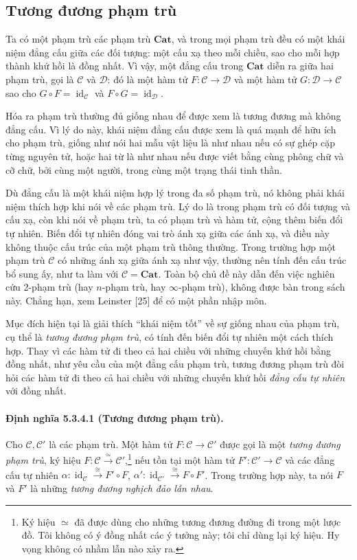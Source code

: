 \subsection{Tương đương phạm trù}
Ta có một phạm trù các phạm trù $\mathbf{Cat}$, và trong mọi phạm trù đều có một khái niệm đẳng cấu giữa các đối tượng: một cấu xạ theo mỗi chiều, sao cho mỗi hợp thành khứ hồi là đồng nhất. Vì vậy, một đẳng cấu trong $\mathbf{Cat}$ diễn ra giữa hai phạm trù, gọi là $\mathcal C$ và $\mathcal D$: đó là một hàm tử $F:\mathcal C\to\mathcal D$ và một hàm tử $G:\mathcal D\to\mathcal C$ sao cho $G\circ F=\operatorname{id}_{\mathcal C}$ và $F\circ G=\operatorname{id}_{\mathcal D}$.

Hóa ra phạm trù thường đủ giống nhau để được xem là tương đương mà không đẳng cấu. Vì lý do này, khái niệm đẳng cấu được xem là quá mạnh để hữu ích cho phạm trù, giống như nói hai mẫu vật liệu là như nhau nếu có sự ghép cặp từng nguyên tử, hoặc hai từ là như nhau nếu được viết bằng cùng phông chữ và cỡ chữ, bởi cùng một người, trong cùng một trạng thái tinh thần.

Dù đẳng cấu là một khái niệm hợp lý trong đa số phạm trù, nó không phải khái niệm thích hợp khi nói về các phạm trù. Lý do là trong phạm trù có đối tượng và cấu xạ, còn khi nói về phạm trù, ta có phạm trù và hàm tử, cộng thêm biến đổi tự nhiên. Biến đổi tự nhiên đóng vai trò ánh xạ giữa các ánh xạ, và điều này không thuộc cấu trúc của một phạm trù thông thường. Trong trường hợp một phạm trù $\mathcal C$ có những ánh xạ giữa ánh xạ như vậy, thường nên tính đến cấu trúc bổ sung ấy, như ta làm với $\mathcal C=\mathbf{Cat}$. Toàn bộ chủ đề này dẫn đến việc nghiên cứu 2-phạm trù (hay $n$-phạm trù, hay $\infty$-phạm trù), không được bàn trong sách này. Chẳng hạn, xem Leinster [25] để có một phần nhập môn.

Mục đích hiện tại là giải thích ``khái niệm tốt'' về sự giống nhau của phạm trù, cụ thể là \emph{tương đương phạm trù}, có tính đến biến đổi tự nhiên một cách thích hợp. Thay vì các hàm tử đi theo cả hai chiều với những chuyến khứ hồi bằng đồng nhất, như yêu cầu của một đẳng cấu phạm trù, tương đương phạm trù đòi hỏi các hàm tử đi theo cả hai chiều với những chuyến khứ hồi \emph{đẳng cấu tự nhiên} với đồng nhất.
\paragraph{Định nghĩa 5.3.4.1 (Tương đương phạm trù).} Cho $\mathcal C,\mathcal C'$ là các phạm trù. Một hàm tử $F:\mathcal C\to\mathcal C'$ được gọi là một \emph{tương đương phạm trù}, ký hiệu $F:\mathcal C\xrightarrow{\simeq}\mathcal C'$,\footnote{Ký hiệu $\simeq$ đã được dùng cho những tương đương đường đi trong một lược đồ. Tôi không có ý đồng nhất các ý tưởng này; tôi chỉ dùng lại ký hiệu. Hy vọng không có nhầm lẫn nào xảy ra.} nếu tồn tại một hàm tử $F':\mathcal C'\to\mathcal C$ và các đẳng cấu tự nhiên $\alpha:\operatorname{id}_{\mathcal C}\xrightarrow{\cong}F'\circ F$, $\alpha':\operatorname{id}_{\mathcal C'}\xrightarrow{\cong}F\circ F'$. Trong trường hợp này, ta nói $F$ và $F'$ là những \emph{tương đương nghịch đảo lẫn nhau}.

